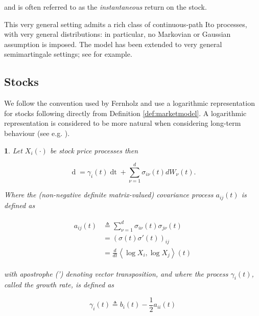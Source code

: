 \documentclass[british]{amsart}
\numberwithin{equation}{section}
\numberwithin{figure}{section}
\theoremstyle{plain}
\theoremstyle{definition}
\theoremstyle{plain}
\theoremstyle{plain}
\newtheorem{lem}[thm]{\protect\lemmaname}
\theoremstyle{plain}
\theoremstyle{remark}
\theoremstyle{plain}
\providecommand{\lemmaname}{Lemma}
\renewcommand{\d}[1]{\mathop{\mathrm{d}{#1}}}
\newcommand{\defeq}{\mathop{\triangleq}}
\begin{document}
and is often referred to as the \textit{instantaneous} return on the stock.

This very general setting admits a rich class of continuous-path Ito processes, with very general distributions: in particular, no Markovian or Gaussian assumption is imposed. The model has been extended to very general semimartingale settings; see \cite{kardaras2003} for example.

\newpage

\subsection{Stocks}

We follow the convention used by Fernholz and use a logarithmic representation for stocks following directly from Definition \ref{def:marketmodel}. A logarithmic representation is considered to be more natural when considering long-term behaviour (see e.g. \cite{fernholz1982}). 

\begin{lem} \cite{fernholz1999pgf} \label{thm:logarithmicrepresentation} Let $X_{i}(\cdot)$ be stock price processes then

	\begin{equation} 
		\label{eq:logX}
				\d{{X_{i}(t)}} = \gamma_{i}(t) \d{t}  + \sum_{\nu=1}^{d} \sigma_{i\nu}(t) dW_{\nu}(t).
	\end{equation}

	Where the (non-negative definite matrix-valued) \textit{covariance process} $a_{ij}(t)$ is defined as
	
	\begin{gather}
		\label{eq:covarianceprocess}
		\begin{split}
			a_{ij}(t)  
				& \defeq \sum_{\nu=1}^{d}\sigma_{i\nu}(t)\sigma_{j\nu}(t) \\ 
				& = \left( \sigma(t)\sigma'(t) \right)_{ij} \\
				& = \frac{d}{dt}\left\langle \log X_{i},\log X_{j}\right\rangle(t)
		\end{split}
	\end{gather}

	with apostrophe (') denoting vector transposition, and where the process $\gamma_{i}(t)$, called the \textit{growth rate}, is defined as

	\begin{equation}
		\label{eq:gamma}
		\gamma_{i}(t)\defeq b_{i}(t)-\frac{1}{2}a_{ii}(t)
	\end{equation}

\end{lem}
\end{document}
